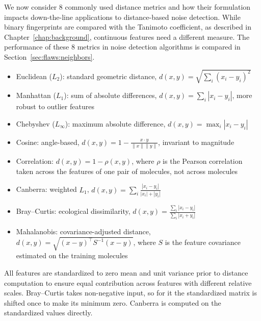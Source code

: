 We now consider 8 commonly used distance metrics and how their formulation impacts down-the-line applications to distance-based noise detection. While binary fingerprints are compared with the Tanimoto coefficient, as described in Chapter~\ref{chap:background}, continuous features need a different measure. The performance of these 8 metrics in noise detection algorithms is compared in Section~\ref{sec:flaws:neighbors}.

\begin{itemize}
    \item Euclidean ($L_2$): standard geometric distance, $d(x, y) = \sqrt{\sum_i (x_i - y_i)^2}$
    \item Manhattan ($L_1$): sum of absolute differences, $d(x, y) = \sum_i |x_i - y_i|$, more robust to outlier features
    \item Chebyshev ($L_\infty$): maximum absolute difference, $d(x, y) = \max_i |x_i - y_i|$
    \item Cosine: angle-based, $d(x, y) = 1 - \frac{x \cdot y}{\|x\| \|y\|}$, invariant to magnitude
    \item Correlation: $d(x, y) = 1 - \rho(x, y)$, where $\rho$ is the Pearson correlation taken across the features of one pair of molecules, not across molecules
    \item Canberra: weighted $L_1$, $d(x, y) = \sum_i \frac{|x_i - y_i|}{|x_i| + |y_i|}$
    \item Bray--Curtis: ecological dissimilarity, $d(x, y) = \frac{\sum_i |x_i - y_i|}{\sum_i |x_i + y_i|}$ \citep{BrayCurtis1957}
    \item Mahalanobis: covariance-adjusted distance, $d(x,y)=\sqrt{(x-y)^\top S^{-1}(x-y)}$, where $S$ is the feature covariance estimated on the training molecules \citep{Mahalanobis1936}
\end{itemize}

All features are standardized to zero mean and unit variance prior to distance computation to ensure equal contribution across features with different relative scales. Bray--Curtis takes non-negative input, so for it the standardized matrix is shifted once to make its minimum zero. Canberra is computed on the standardized values directly. %

